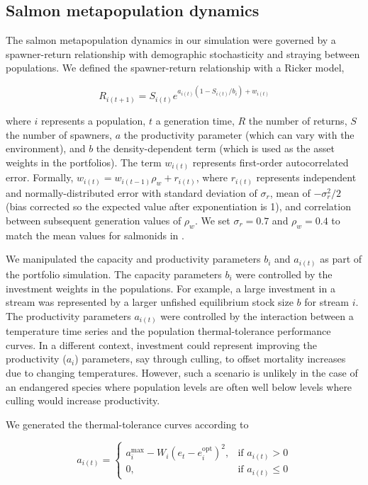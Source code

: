 \documentclass[12pt,english]{article}
\begin{document}
\begin{spacing}{1.9}
\subsection{Salmon metapopulation dynamics}\label{salmon-metapopulation-dynamics}

The salmon metapopulation dynamics in our simulation were governed by a spawner-return relationship with demographic stochasticity and straying between populations. We defined the spawner-return relationship with a Ricker model,

\[R_{i(t+1)} = S_{i(t)}e^{a_{i(t)}(1-S_{i(t)}/b_i) + w_{i(t)}}\]

\noindent
where $i$ represents a population, $t$ a generation time, $R$ the number of returns, $S$ the number of spawners, $a$ the productivity parameter (which can vary with the environment), and $b$ the density-dependent term (which is used as the asset weights in the portfolios). The term $w_{i(t)}$ represents first-order autocorrelated error. Formally, $w_{i(t)} = w_{i(t-1)} \rho_w + r_{i(t)}$, where $r_{i(t)}$ represents independent and normally-distributed error with standard deviation of $\sigma_r$, mean of $-\sigma_r^2 / 2$ (bias corrected so the expected value after exponentiation is 1), and correlation between subsequent generation values of $\rho_w$. We set $\sigma_r = 0.7$ and $\rho_w = 0.4$ to match the mean values for salmonids in \citet{thorson2014a}.

We manipulated the capacity and productivity parameters $b_i$ and $a_{i(t)}$ as part of the portfolio simulation. The capacity parameters $b_i$ were controlled by the investment weights in the populations. For example, a large investment in a stream was represented by a larger unfished equilibrium stock size $b$ for stream $i$. The productivity parameters $a_{i(t)}$ were controlled by the interaction between a temperature time series and the population thermal-tolerance performance curves. In a different context, investment could represent improving the productivity ($a_i$) parameters, say through culling, to offset mortality increases due to changing temperatures. However, such a scenario is unlikely in the case of an endangered species where population levels are often well below levels where culling would increase productivity.

We generated the thermal-tolerance curves according to

\[a_{i(t)} = \begin{cases} a_i^{\mathrm{max}} -
W_i (e_t - e_i^{\mathrm{opt}})^2,
& \text{if } a_{i(t)} > 0\\ 0, & \text{if } a_{i(t)} \leq
0 \end{cases}\]


\end{spacing}
\end{document}
